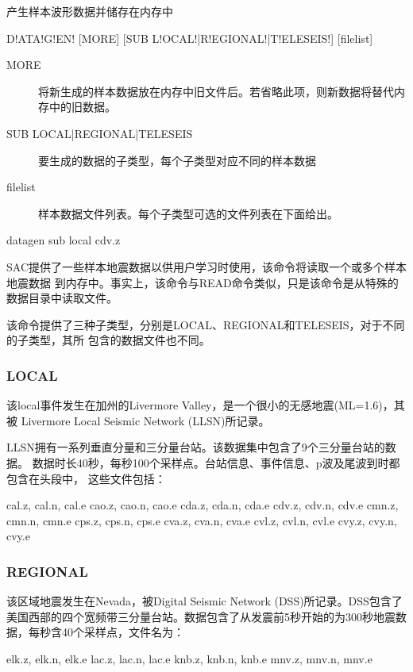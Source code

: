 \label{cmd:datagen}

产生样本波形数据并储存在内存中

\begin{SACSTX}
D!ATA!G!EN! [MORE] [SUB L!OCAL!|R!EGIONAL!|T!ELESEIS!] [filelist]
\end{SACSTX}

\begin{description}
\item [MORE] 将新生成的样本数据放在内存中旧文件后。若省略此项，则新数据将替代内存中的旧数据。
\item [SUB LOCAL|REGIONAL|TELESEIS] 要生成的数据的子类型，每个子类型对应不同的样本数据
\item [filelist] 样本数据文件列表。每个子类型可选的文件列表在下面给出。
\end{description}

\begin{SACDFT}
datagen sub local cdv.z
\end{SACDFT}

SAC提供了一些样本地震数据以供用户学习时使用，该命令将读取一个或多个样本地震数据
到内存中。事实上，该命令与READ命令类似，只是该命令是从特殊的数据目录中读取文件。

该命令提供了三种子类型，分别是LOCAL、REGIONAL和TELESEIS，对于不同的子类型，其所
包含的数据文件也不同。

\subsubsection*{LOCAL}
该local事件发生在加州的Livermore Valley，是一个很小的无感地震(ML=1.6)，其被
Livermore Local Seismic Network (LLSN)所记录。

LLSN拥有一系列垂直分量和三分量台站。该数据集中包含了9个三分量台站的数据。
数据时长40秒，每秒100个采样点。台站信息、事件信息、p波及尾波到时都包含在头段中，
这些文件包括：
\begin{SACCode}
    cal.z, cal.n, cal.e
    cao.z, cao.n, cao.e
    cda.z, cda.n, cda.e
    cdv.z, cdv.n, cdv.e
    cmn.z, cmn.n, cmn.e
    cps.z, cps.n, cps.e
    cva.z, cva.n, cva.e
    cvl.z, cvl.n, cvl.e
    cvy.z, cvy.n, cvy.e
\end{SACCode}

\subsubsection*{REGIONAL}
该区域地震发生在Nevada，被Digital Seismic Network (DSS)所记录。DSS包含了美国西部的四个宽频带三分量台站。数据包含了从发震前5秒开始的为300秒地震数据，每秒含40个采样点，文件名为：
\begin{SACCode}
    elk.z, elk.n, elk.e
    lac.z, lac.n, lac.e
    knb.z, knb.n, knb.e
    mnv.z, mnv.n, mnv.e
\end{SACCode}

